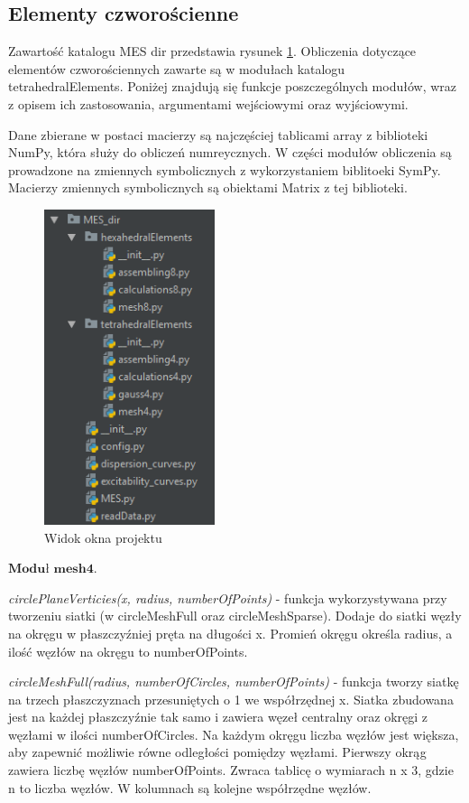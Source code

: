 
\subsection{Elementy czworościenne}
\label{cha:elementy czworościenne}

Zawartość katalogu MES dir przedstawia rysunek \ref{fig:okno_projektu_MES}. Obliczenia dotyczące elementów czworościennych zawarte są w modułach katalogu tetrahedralElements. Poniżej znajdują się funkcje poszczególnych modułów, wraz z opisem ich zastosowania, argumentami wejściowymi oraz wyjściowymi.

Dane zbierane w postaci macierzy są najczęściej tablicami array z biblioteki NumPy, która służy do obliczeń numreycznych. W części modułów obliczenia są prowadzone na zmiennych symbolicznych z wykorzystaniem biblitoeki SymPy. Macierzy zmiennych symbolicznych są obiektami Matrix z tej biblioteki.

\begin{figure}[h]
\centering
\includegraphics[width=5cm]{Zdjecia/5/okno_projektu_MES}
\caption{Widok okna projektu}
\label{fig:okno_projektu_MES}
\end{figure}


 \( \textbf{Moduł mesh4} \).

\textit{circlePlaneVerticies(x, radius, numberOfPoints)} - funkcja wykorzystywana przy tworzeniu siatki (w circleMeshFull oraz circleMeshSparse). Dodaje do siatki węzły na okręgu w płaszczyźniej pręta na długości x. Promień okręgu określa radius, a ilość węzłów na okręgu to numberOfPoints.

\textit{circleMeshFull(radius, numberOfCircles, numberOfPoints)} - funkcja tworzy siatkę na trzech płaszczyznach przesuniętych o 1 we współrzędnej x. Siatka zbudowana jest na każdej płaszczyźnie tak samo i zawiera węzeł centralny oraz okręgi z węzłami w ilości numberOfCircles. Na każdym okręgu liczba węzłów jest większa, aby zapewnić możliwie równe odległości pomiędzy węzłami. Pierwszy okrąg zawiera liczbę węzłów numberOfPoints. Zwraca tablicę o wymiarach n x 3, gdzie n to liczba węzłów. W kolumnach są kolejne współrzędne węzłów.

